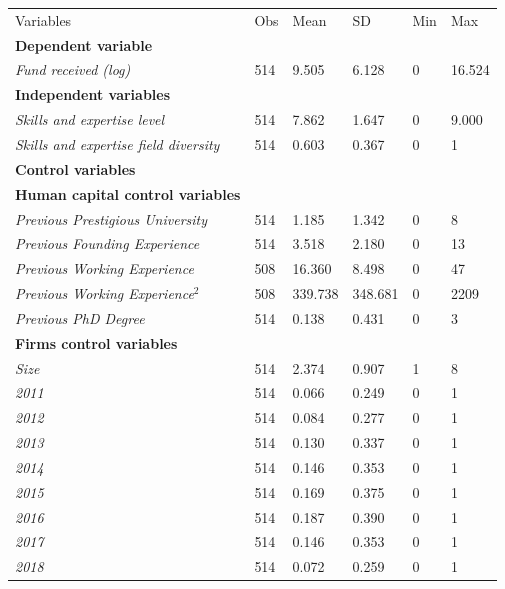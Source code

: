 \documentclass[12pt]{article}
\begin{document}
\begin{table} [ht]
\scriptsize
\renewcommand{\arraystretch}{1.5}
\begin{tabularx}{\textwidth}{ p{4.9cm} p{1.6cm} p{1.6cm} p{1.6cm} p{1.6cm} p{1.6cm} }
\toprule
\multicolumn{1}{l}{Variables}&\multicolumn{1}{l}{Obs}&\multicolumn{1}{l}{Mean}&\multicolumn{1}{l}{SD}&\multicolumn{1}{l}{Min}&\multicolumn{1}{l}{Max} \\
\cmidrule(r){1-6}
\textbf{Dependent variable} & & & & & \\
\textit{Fund received (log)} & 514 & 9.505 & 6.128 & 0 & 16.524 \\
\cmidrule(r){1-6}
\textbf{Independent variables} & & & & & \\
\textit{Skills and expertise level} & 514 & 7.862 & 1.647 & 0 & 9.000 \\
\textit{Skills and expertise field diversity} & 514 & 0.603 & 0.367 & 0 & 1 \\
\cmidrule(r){1-6}\textbf{Control variables} & & & & & \\
\textbf{Human capital control variables} & & & & & \\
\textit{Previous Prestigious University} & 514 & 1.185 & 1.342 & 0 & 8 \\
\textit{Previous Founding Experience} & 514 & 3.518 & 2.180 & 0 & 13 \\
\textit{Previous Working Experience} & 508 & 16.360 & 8.498 & 0 & 47 \\
\textit{Previous Working Experience$^2$} & 508 & 339.738 & 348.681 & 0 & 2209 \\
\textit{Previous PhD Degree} & 514 & 0.138 & 0.431 & 0 & 3 \\
\cmidrule(r){1-6}
\textbf{Firms control variables} & & & & & \\
\textit{Size} & 514 & 2.374 & 0.907 & 1 & 8 \\
\textit{2011} & 514 & 0.066 & 0.249 & 0 & 1 \\
\textit{2012} & 514 & 0.084 & 0.277 & 0 & 1 \\
\textit{2013} & 514 & 0.130 & 0.337 & 0 & 1 \\
\textit{2014} & 514 & 0.146 & 0.353 & 0 & 1 \\
\textit{2015} & 514 & 0.169 & 0.375 & 0 & 1 \\
\textit{2016} & 514 & 0.187 & 0.390 & 0 & 1 \\
\textit{2017} & 514 & 0.146 & 0.353 & 0 & 1 \\
\textit{2018} & 514 & 0.072 & 0.259 & 0 & 1 \\

\end{tabularx}
\end{table}
\end{document}
